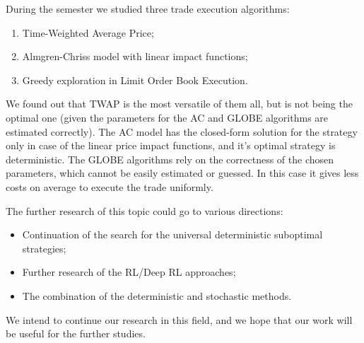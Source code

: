 \conclusion %
    During the semester we studied three trade execution algorithms:
    \begin{enumerate}
        \item Time-Weighted Average Price;
        \item Almgren-Chriss model with linear impact functions;
        \item Greedy exploration in Limit Order Book Execution.
    \end{enumerate}
    We found out that TWAP is the most versatile of them all, but is not being the optimal one (given the parameters for the AC and GLOBE algorithms are estimated correctly). 
    The AC model has the closed-form solution for the strategy only in case of the 
    linear price impact functions, and it's optimal strategy is deterministic.
    The GLOBE algorithms rely on the correctness of the chosen parameters, which cannot be easily estimated or guessed.
    In this case it gives less costs on average to execute the trade uniformly.

    The further research of this topic could go to various directions:
    \begin{itemize}
        \item Continuation of the search for the universal deterministic suboptimal strategies;
        \item Further research of the RL/Deep RL approaches;
        \item The combination of the deterministic and stochastic methods.
    \end{itemize}

    We intend to continue our research in this field, and we hope that our work will be useful for the further studies.